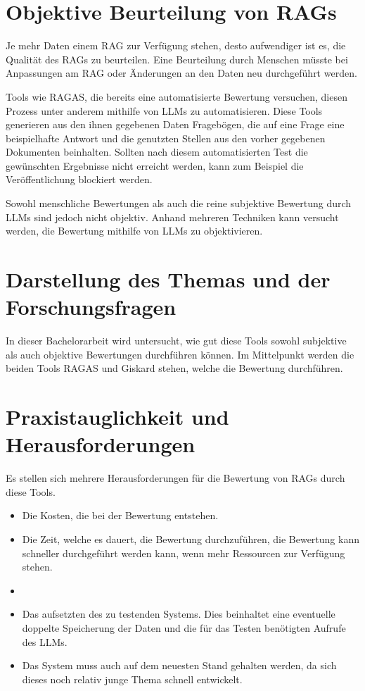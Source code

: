 \section{Objektive Beurteilung von RAGs}
Je mehr Daten einem RAG zur Verfügung stehen, desto aufwendiger ist es, die Qualität des RAGs zu beurteilen.
Eine Beurteilung durch Menschen müsste bei Anpassungen am RAG oder Änderungen an den Daten neu durchgeführt werden.

Tools wie RAGAS, die bereits eine automatisierte Bewertung versuchen, diesen Prozess unter anderem mithilfe von LLMs zu automatisieren.
Diese Tools generieren aus den ihnen gegebenen Daten Fragebögen, die auf eine Frage eine beispielhafte Antwort und die genutzten Stellen aus den vorher gegebenen Dokumenten beinhalten.
Sollten nach diesem automatisierten Test die gewünschten Ergebnisse nicht erreicht werden, kann zum Beispiel die Veröffentlichung blockiert werden.

Sowohl menschliche Bewertungen als auch die reine subjektive Bewertung durch LLMs sind jedoch nicht objektiv.
Anhand mehreren Techniken kann versucht werden, die Bewertung mithilfe von LLMs zu objektivieren.

\section{Darstellung des Themas und der Forschungsfragen}
In dieser Bachelorarbeit wird untersucht, wie gut diese Tools sowohl subjektive als auch objektive Bewertungen durchführen können.
Im Mittelpunkt werden die beiden Tools RAGAS und Giskard stehen, welche die Bewertung durchführen.


\section{Praxistauglichkeit und Herausforderungen}
Es stellen sich mehrere Herausforderungen für die Bewertung von RAGs durch diese Tools.
\begin{itemize}
    \item Die Kosten, die bei der Bewertung entstehen.
    \item Die Zeit, welche es dauert, die Bewertung durchzuführen, die Bewertung kann schneller durchgeführt werden kann, wenn mehr Ressourcen zur Verfügung stehen.
    \item \item Das aufsetzten des zu testenden Systems. Dies beinhaltet eine eventuelle doppelte Speicherung der Daten und die für das Testen benötigten Aufrufe des LLMs.
    \item Das System muss auch auf dem neuesten Stand gehalten werden, da sich dieses noch relativ junge Thema schnell entwickelt.
\end{itemize}

